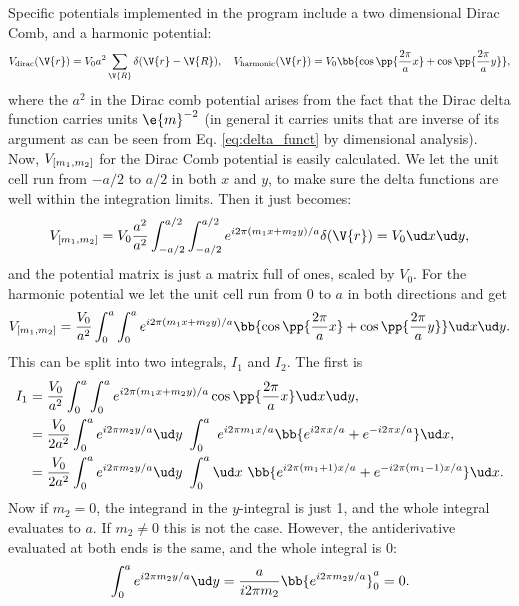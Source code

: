 \documentclass[main.tex]{subfiles}
\begin{document}
	Specific potentials implemented in the program include a two dimensional Dirac Comb, and a harmonic potential:
	\begin{equation}
		V_{\text{dirac}}(\V{r}) = V_0 a^2 \sum_{\V{R}} \delta(\V{r}-\V{R}), \quad V_{\text{harmonic}}(\V{r}) = V_0 \bb{\cos\pp{\frac{2\pi}{a} x} + \cos\pp{\frac{2\pi}{a} y}},
	\end{equation}
	where the $ a^2 $ in the Dirac comb potential arises from the fact that the Dirac delta function carries units $ \e{m}^{-2} $ (in general it carries units that are inverse of its argument as can be seen from Eq. \eqref{eq:delta_funct} by dimensional analysis). Now, $ V_{[m_1, m_2]} $ for the Dirac Comb potential is easily calculated. We let the unit cell run from $ -a/2 $ to $ a/2 $ in both $ x $ and $ y $, to make sure the delta functions are well within the integration limits. Then it just becomes:
	\begin{equation}
		V\coef{m_1, m_2} = V_0 \frac{a^2}{a^2} \int_{-a/2}^{a/2} \int_{-a/2}^{a/2} e^{i 2\pi (m_1 x + m_2 y)/a} \delta(\V{r}) = V_0 \ud x \ud y,
	\end{equation}
	and the potential matrix is just a matrix full of ones, scaled by $ V_0 $. For the harmonic potential we let the unit cell run from $ 0 $ to $ a $ in both directions and get
	\begin{equation}
		V\coef{m_1, m_2} = \frac{V_0}{a^2} \int_{0}^{a} \int_0^a e^{i 2\pi(m_1x + m_2y)/a} \bb{\cos\pp{\frac{2\pi}{a} x} + \cos\pp{\frac{2\pi}{a} y}} \ud x \ud y.
	\end{equation}
	This can be split into two integrals, $ I_1 $ and $ I_2 $. The first is
	\begin{align}
		I_1 &=  \frac{V_0}{a^2} \int_{0}^{a} \int_0^a e^{i 2\pi(m_1x + m_2y)/a}\cos\pp{\frac{2\pi}{a} x} \ud x \ud y , \\
		&= \frac{V_0}{2a^2} \int_{0}^{a} e^{i 2\pi m_2 y / a} \ud y\ \int_{0}^{a} \ e^{i 2\pi m_1 x/a} \bb{e^{i 2\pi x/a} + e^{-i 2\pi x/a}} \ud x, \\
		&= \frac{V_0}{2a^2} \int_0^a e^{i 2\pi m_2 y / a} \ud y\  \int_{0}^{a} \ud x\ \bb{e^{i 2\pi(m_1+1) x/a} + e^{-i 2\pi (m_1-1)x/a}} \ud x.
	\end{align}
	Now if $ m_2 = 0 $, the integrand in the $ y $-integral is just 1, and the whole integral evaluates to $ a $. If $ m_2 \neq 0 $ this is not the case. However, the antiderivative evaluated at both ends is the same, and the whole integral is 0:
	\begin{equation}
		\int_{0}^{a} e^{i 2\pi m_2 y/a} \ud y = \frac{a}{i 2\pi m_2} \bb{e^{i2\pi m_2 y /a}}_0^a = 0.
	\end{equation}
\end{document}
